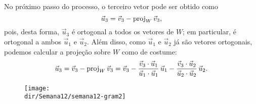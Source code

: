\documentclass[../livro.tex]{subfiles}  %
\providecommand{\dir}{..}
\begin{document}
\begin{example}
No próximo passo do processo, o terceiro vetor pode ser obtido como
\[
\vec{u}_3 = \vec{v}_3 - \operatorname{proj}_{W} \vec{v}_3,
\] pois, desta forma, $\vec{u}_3$ é ortogonal a todos os vetores de $W$; em particular, é ortogonal a ambos $\vec{u}_1$ e $\vec{u}_2$. Além disso, como $\vec{u}_1$ e $\vec{u}_2$ já são vetores ortogonais, podemos calcular a projeção sobre $W$ como de costume:
\[
\vec{u}_3 = \vec{v}_3 - \operatorname{proj}_{W} \vec{v}_3 = \vec{v}_3 - \frac{\vec{v}_3 \cdot \vec{u}_1}{\vec{u}_1 \cdot \vec{u}_1} \, \vec{u}_1 - \frac{\vec{v}_3 \cdot \vec{u}_2}{\vec{u}_2 \cdot \vec{u}_2} \, \vec{u}_2.
\]
\begin{figure}[h!]
\begin{center}
\texttt{[image: \\dir/Semana12/semana12-gram2]}
\end{center}
\end{figure}


\end{example}
\end{document}
